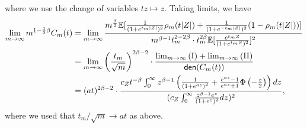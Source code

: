 where we use the change of variables $tz \mapsto z$. Taking limits, we have
\begin{align*}
  \lim_{m\to \infty} m^{1 - \frac{1}{2} \beta} C_m(t)
  & = \lim_{m\to \infty}  \frac{m^{\frac \beta 2}
    \mathbb{E}[\frac{1}{(1 + e^{t_m|Z|})^2} \rho_m(t |Z|)
      + \frac{1}{(1 + e^{-t_m|Z|})^2}(1-\rho_m(t|Z|))]}{
    m^{\beta - 1} t_m^{2 - 2 \beta} \cdot t_m^{2 \beta} \mathbb{E}[\frac{e^{t_m Z} }{ (1 + e^{t_m Z})^2}]^2} \\
  & = \lim_{m \to \infty}
  \left(\frac{t_m}{\sqrt{m}}\right)^{2 \beta - 2}
  \cdot \frac{\lim_{m\to \infty}\mathrm{(I)} + \lim_{m\to \infty}\mathrm{(II)}}{\mathsf{den}(C_m(t))} \\
  & =
  (at)^{2 \beta - 2}
  \cdot \frac{c_Z {t}^{-\beta} \int_0^\infty z^{\beta - 1}\left(\frac{1}{\left(1 + e^{a z}\right)^2} + \frac{e^{a z} - 1}{e^{a z} + 1} \Phi \left(-\frac{z}{2}\right)\right) dz}{  (c_Z\int_{0}^\infty \frac{z^{\beta - 1} e^{z} }{ (1 + e^{z})^2} dz)^2},
\end{align*}
where we used that $t_m/\sqrt{m} \to at$ as above. 

